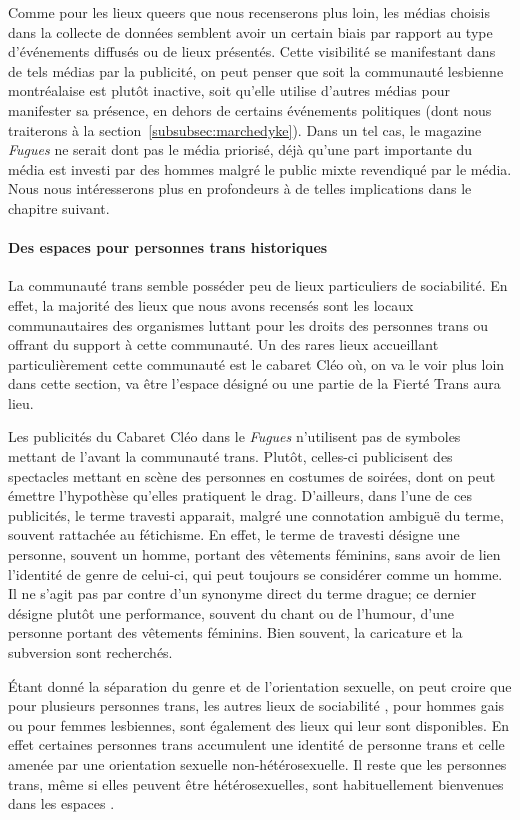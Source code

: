 Comme pour les lieux queers que nous recenserons plus loin, les médias choisis dans la collecte de données semblent avoir un certain biais par rapport au type d'événements diffusés ou de lieux présentés.
Cette visibilité se manifestant dans de tels médias par la publicité, on peut penser que soit la communauté lesbienne montréalaise est plutôt inactive, soit qu'elle utilise d'autres médias pour manifester sa présence, en dehors de certains événements politiques (dont nous traiterons à la section~\ref{subsubsec:marchedyke}).
Dans un tel cas, le magazine \emph{Fugues} ne serait dont pas le média priorisé, déjà qu'une part importante du média est investi par des hommes malgré le public mixte revendiqué par le média.
Nous nous intéresserons plus en profondeurs à de telles implications dans le chapitre suivant.

\paragraph{Des espaces pour personnes trans historiques}
La communauté trans semble posséder peu de lieux particuliers de sociabilité.
En effet, la majorité des lieux que nous avons recensés sont les locaux communautaires des organismes luttant pour les droits des personnes trans ou offrant du support à cette communauté.
Un des rares lieux accueillant particulièrement cette communauté est le cabaret Cléo où, on va le voir plus loin dans cette section, va être l'espace désigné ou une partie de la Fierté Trans aura lieu.

Les publicités du Cabaret Cléo dans le \emph{Fugues} n'utilisent pas de symboles mettant de l'avant la communauté trans.
Plutôt, celles-ci publicisent des spectacles mettant en scène des personnes en costumes de soirées, dont on peut émettre l'hypothèse qu'elles pratiquent le drag.
D'ailleurs, dans l'une de ces publicités, le terme travesti apparait, malgré une connotation ambiguë du terme, souvent rattachée au fétichisme.
En effet, le terme de travesti désigne une personne, souvent un homme, portant des vêtements féminins, sans avoir de lien l'identité de genre de celui-ci, qui peut toujours se considérer comme un homme.
Il ne s'agit pas par contre d'un synonyme direct du terme drague; ce dernier désigne plutôt une performance, souvent du chant ou de l'humour, d'une personne portant des vêtements féminins.
Bien souvent,  la caricature et la subversion sont recherchés.

Étant donné la séparation du genre et de l'orientation sexuelle, on peut croire que pour plusieurs personnes trans, les autres lieux de sociabilité \lgbt, pour hommes gais ou pour femmes lesbiennes, sont également des lieux qui leur sont disponibles.
En effet certaines personnes trans accumulent une identité de personne trans et celle amenée par une orientation sexuelle non-hétérosexuelle.
Il reste que les personnes trans, même si elles peuvent être hétérosexuelles, sont habituellement bienvenues dans les espaces \lgbt{}.


